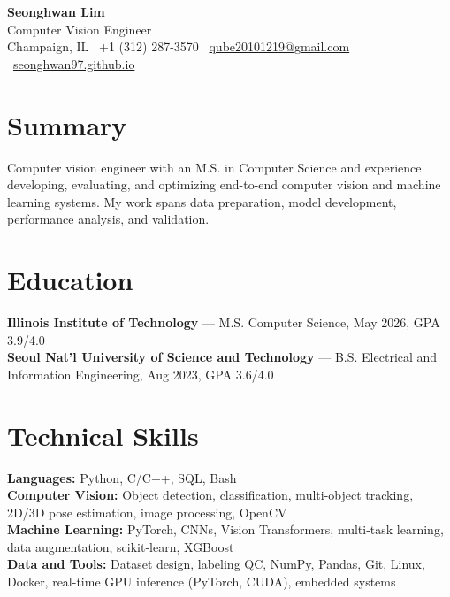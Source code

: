 \documentclass[letterpaper,10pt]{extarticle}
\begin{document}
\begin{center}
  {\LARGE\bfseries Seonghwan Lim}\\[2pt]
  {\small Computer Vision Engineer}\\[3pt]
  {\footnotesize
    Champaign, IL \textbar\ +1 (312) 287-3570 \textbar\
    \href{mailto:qube20101219@gmail.com}{qube20101219@gmail.com} \textbar\
    \href{https://seonghwan97.github.io}{seonghwan97.github.io}
  }
\end{center}

\section{Summary}
Computer vision engineer with an M.S. in Computer Science and experience developing, evaluating, and
optimizing end-to-end computer vision and machine learning systems. My work spans data preparation,
model development, performance analysis, and validation.

\section{Education}
\textbf{Illinois Institute of Technology} --- M.S. Computer Science, May 2026, GPA 3.9/4.0\\
\textbf{Seoul Nat'l University of Science and Technology} --- B.S. Electrical and Information
Engineering, Aug 2023, GPA 3.6/4.0

\section{Technical Skills}
\textbf{Languages:} Python, C/C++, SQL, Bash\\
\textbf{Computer Vision:} Object detection, classification, multi-object tracking, 2D/3D pose estimation, image processing, OpenCV\\
\textbf{Machine Learning:} PyTorch, CNNs, Vision Transformers, multi-task learning, data augmentation, scikit-learn, XGBoost\\
\textbf{Data and Tools:} Dataset design, labeling QC, NumPy, Pandas, Git, Linux, Docker, real-time GPU inference (PyTorch, CUDA), embedded systems
\end{document}
